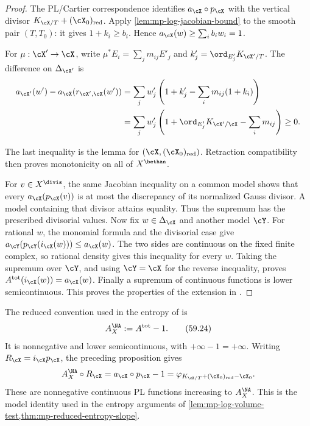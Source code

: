\begin{proof}
The PL/Cartier correspondence identifies
$a_{\cX}\circ p_{\cX}$ with the vertical divisor
$K_{\cX/T}+(\cX_0)_{\mathrm{red}}$.
Apply \cref{lem:mp-log-jacobian-bound} to the smooth pair
$(T,T_0)$: it gives $1+k_i\geq b_i$. Hence
$a_{\cX}(w)\geq\sum_i b_iw_i=1$.

\par\noindent\begin{minipage}{\linewidth}
For $\mu:\cX'\to\cX$, write
$\mu^*E_i=\sum_j m_{ij}E'_j$ and
$k'_j=\ord_{E'_j}K_{\cX'/T}$. The difference on
$\Delta_{\cX'}$ is
\[
 \begin{aligned}
 a_{\cX'}(w')-a_{\cX}(r_{\cX',\cX}(w'))
   &=\sum_j w'_j\left(1+k'_j-\sum_i m_{ij}(1+k_i)\right)\\
   &=\sum_j w'_j\left(1+\ord_{E'_j}K_{\cX'/\cX}
                           -\sum_i m_{ij}\right)\geq0.
\end{aligned}
\]
\end{minipage}\par
The last inequality is the lemma for
$(\cX,(\cX_0)_{\mathrm{red}})$. Retraction compatibility
then proves monotonicity on all of $X^{\bethan}$.

For $v\in X^{\divis}$, the same Jacobian inequality on a
common model shows that every $a_{\cX}(p_{\cX}(v))$ is at
most the discrepancy of its normalized Gauss divisor. A
model containing that divisor attains equality. Thus the
supremum has the prescribed divisorial values.
Now fix $w\in\Delta_{\cX}$ and another model $\cY$.
For rational $w$, the monomial formula and the divisorial
case give
$a_{\cY}(p_{\cY}(i_{\cX}(w)))\leq a_{\cX}(w)$.
The two sides are continuous on the fixed finite complex,
so rational density gives this inequality for every $w$.
Taking the supremum over $\cY$, and using $\cY=\cX$ for
the reverse inequality, proves
$A^{\mathrm{tot}}(i_{\cX}(w))=a_{\cX}(w)$.
Finally a supremum of continuous functions is lower
semicontinuous. This proves the properties of the extension
in \cite[Section~3.2, equation~(3.2.4) and
Remark~3.2.1, pp.~31--32]{MPTropicalV2}.
\end{proof}

The reduced convention used in the entropy of
\cite[Definition~2.4.1]{MPWN25} is
\[
                    A_X^{\NA}:=A^{\mathrm{tot}}-1.
\tag{59.24}\label{eq:mp-reduced-discrepancy}
\]
It is nonnegative and lower semicontinuous, with $+\infty-1=+\infty$.
Writing $R_{\cX}=i_{\cX}p_{\cX}$, the preceding proposition gives
\[
 A_X^{\NA}\circ R_{\cX}
   =a_{\cX}\circ p_{\cX}-1
   =\varphi_{K_{\cX/T}+(\cX_0)_{\mathrm{red}}-\cX_0}.
\]
These are nonnegative continuous PL functions increasing to
$A_X^{\NA}$. This is the model identity used in the entropy
arguments of \cref{lem:mp-log-volume-test,thm:mp-reduced-entropy-slope}.

